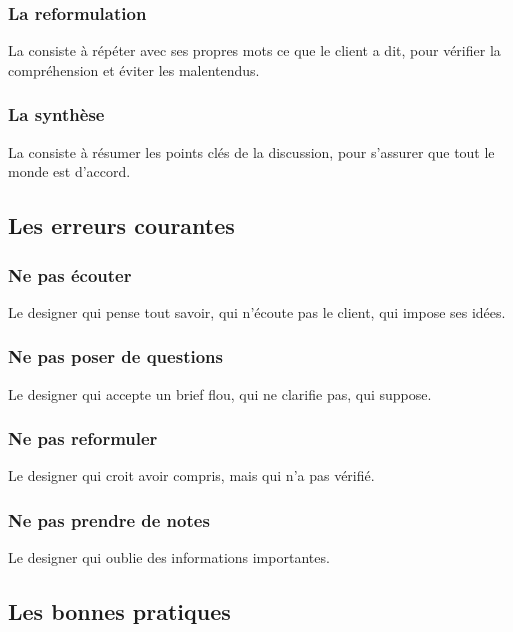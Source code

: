 \subsubsection{La reformulation}

La  consiste à répéter avec ses propres mots ce que le client a dit, pour vérifier la compréhension et éviter les malentendus.

\subsubsection{La synthèse}

La  consiste à résumer les points clés de la discussion, pour s'assurer que tout le monde est d'accord.

\subsection{Les erreurs courantes}

\subsubsection{Ne pas écouter}

Le designer qui pense tout savoir, qui n'écoute pas le client, qui impose ses idées.

\subsubsection{Ne pas poser de questions}

Le designer qui accepte un brief flou, qui ne clarifie pas, qui suppose.

\subsubsection{Ne pas reformuler}

Le designer qui croit avoir compris, mais qui n'a pas vérifié.

\subsubsection{Ne pas prendre de notes}

Le designer qui oublie des informations importantes.

\subsection{Les bonnes pratiques}

